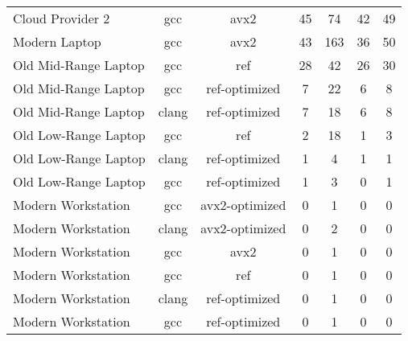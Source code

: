 \begin{table}
\begin{tabularx}{\linewidth}{l c c c c c c}
            Cloud Provider 2 &                  gcc &                 avx2 &                   45 &                   74 &                   42 &                   49\\
               Modern Laptop &                  gcc &                 avx2 &                   43 &                  163 &                   36 &                   50\\
        Old Mid-Range Laptop &                  gcc &                  ref &                   28 &                   42 &                   26 &                   30\\
        Old Mid-Range Laptop &                  gcc &        ref-optimized &                    7 &                   22 &                    6 &                    8\\
        Old Mid-Range Laptop &                clang &        ref-optimized &                    7 &                   18 &                    6 &                    8\\
        Old Low-Range Laptop &                  gcc &                  ref &                    2 &                   18 &                    1 &                    3\\
        Old Low-Range Laptop &                clang &        ref-optimized &                    1 &                    4 &                    1 &                    1\\
        Old Low-Range Laptop &                  gcc &        ref-optimized &                    1 &                    3 &                    0 &                    1\\
          Modern Workstation &                  gcc &       avx2-optimized &                    0 &                    1 &                    0 &                    0\\
          Modern Workstation &                clang &       avx2-optimized &                    0 &                    2 &                    0 &                    0\\
          Modern Workstation &                  gcc &                 avx2 &                    0 &                    1 &                    0 &                    0\\
          Modern Workstation &                  gcc &                  ref &                    0 &                    1 &                    0 &                    0\\
          Modern Workstation &                clang &        ref-optimized &                    0 &                    1 &                    0 &                    0\\
          Modern Workstation &                  gcc &        ref-optimized &                    0 &                    1 &                    0 &                    0\\
        \bottomrule
    \end{tabularx}
\end{table}